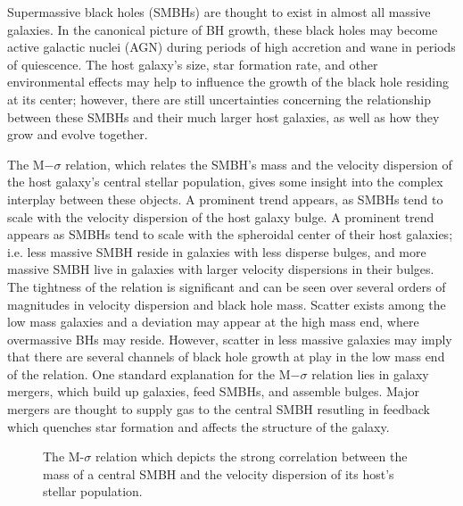 \documentclass[12pt,headA,chapB]{fiskthesis}
\begin{document}
Supermassive black holes (SMBHs) are thought to exist in almost all massive galaxies. \citep{Kormendy2013} In the canonical picture of BH growth, these black holes may become active galactic nuclei (AGN) during periods of high accretion and wane in periods of quiescence. \citep{Alexander2005,Papovich2006,Volonteri2012} The host galaxy's size, star formation rate, and other environmental effects may help to influence the growth of the black hole residing at its center; however, there are still uncertainties concerning the relationship between these SMBHs and their much larger host galaxies, as well as how they grow and evolve together. \citep[5-8 citations here]{Haehnelt2000,DiMatteo2005,Hopkins2006,Fu2008,Sijacki2009,Silverman2009,Mullaney2012}

The M$-\sigma$ relation, which relates the SMBH's mass and the velocity dispersion of the host galaxy's central stellar population, gives some insight into the complex interplay between these objects. \citep{Ferrarese2000} A prominent trend appears, as SMBHs tend to scale with the velocity dispersion of the host galaxy bulge. A prominent trend appears as SMBHs tend to scale with the spheroidal center of their host galaxies; i.e. less massive SMBH reside in galaxies with less disperse bulges, and more massive SMBH live in galaxies with larger velocity dispersions in their bulges. The tightness of the relation is significant and can be seen over several orders of magnitudes in velocity dispersion and black hole mass. \citep{Merritt2001,Graham2011,Mcconnell2013,Kormendy2013} Scatter exists among the low mass galaxies and a deviation may appear at the high mass end, where overmassive BHs may reside. \citep{VanDenBosch2007,Moster2010,Natarajan2011} However, scatter in less massive galaxies may imply that there are several channels of black hole growth at play in the low mass end of the relation. \citep{Micic2007,Volonteri2009,Reines2013,Graham2014} One standard explanation for the M$-\sigma$ relation lies in galaxy mergers, which build up galaxies, feed SMBHs, and assemble bulges. \citep{DiMatteo2005,Shen2008} Major mergers are thought to supply gas to the central SMBH resutling in feedback which quenches star formation and affects the structure of the galaxy. 

\begin{figure}
\centerline{}
\caption[M-$\sigma$ Relation]{The M-$\sigma$ relation which depicts the strong correlation between the mass of a central SMBH and the velocity dispersion of its host's stellar population. \cite{Xiao2011}}
\label{msigma} 
\end{figure}
\end{document}
